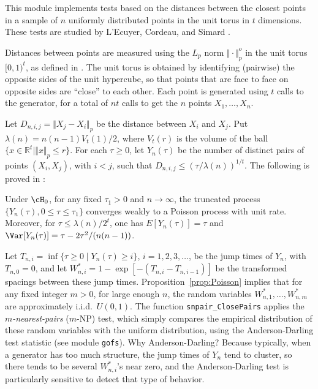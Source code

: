 
This module implements tests based on the distances between
the closest points in a sample of $n$ uniformly distributed points in
the unit torus in $t$ dimensions.  
These tests are studied by L'Ecuyer, Cordeau, and Simard \cite{rLEC00c}.

Distances between points are measured using the $L_p$ norm 
$\Vert\cdot\Vert_p^o$ in the unit torus $[0,1)^t$, 
as defined in \cite{rLEC00c}.
The unit torus is obtained by identifying (pairwise) the opposite 
sides of the unit hypercube, so that points that are face to face on 
opposite sides are ``close'' to each other.
Each point is generated using $t$ calls to the generator, for a total
of $nt$ calls to get the $n$ points $X_1,\dots,X_n$.

Let $D_{n,i,j} = \Vert X_j - X_i\Vert_p$
be the distance between $X_i$ and $X_j$.
Put $\lambda(n) = n(n-1)V_t(1)/2$, where $V_t(r)$
is the volume of the ball $\{x \in \mathbb{R}^t \mid \Vert x\Vert_p \le r\}$.
For each $\tau\ge 0$, let $Y_n(\tau)$ be the number of distinct pairs
of points $(X_i, X_j)$, with $i<j$, such that
$D_{n,i,j} \le (\tau/\lambda(n))^{1/t}$.
The following is proved in \cite{rLEC00c}:

\begin {proposition}                      \label{prop:Poisson} 
Under $\cH_0$, for any fixed $\tau_1 > 0$ and $n\to\infty$, 
the truncated process $\{Y_n(\tau), 0\le \tau\le \tau_1\}$
converges weakly to a Poisson process with unit rate.
Moreover, for $\tau\le \lambda(n) /2^{t}$, one has 
$E[Y_n(\tau)] = \tau$ and $\Var[Y_n(\tau)] = \tau - {2\tau^2 / (n(n-1))}$.
\end {proposition}

Let $T_{n,i} = \inf\{\tau\ge 0 \mid Y_n(\tau) \ge i\}$, $i=1,2,3,\dots$,
be the jump times of $Y_n$, with $T_{n,0}=0$, and let
$W^*_{n,i} = 1-\exp[-(T_{n,i} - T_{n,i-1})]$ be the transformed
spacings between these jump times.
Proposition~\ref{prop:Poisson} implies that for any fixed integer $m > 0$,
for large enough $n$, the random variables $W^*_{n,1},\dots,W^*_{n,m}$
are approximately i.i.d.\ $U(0,1)$.
The function {\tt snpair\_ClosePairs} applies the 
{\em $m$-nearest-pairs\/} ({$m$-NP}) test,
which simply compares the empirical distribution of these random
variables with the uniform distribution, 
using the Anderson-Darling test statistic (see module {\tt gofs}).
Why Anderson-Darling?  Because typically, when a generator has too
much structure, the jump times of $Y_n$ tend to cluster, so there tends
to be several $W^*_{n,i}$'s near zero, and the Anderson-Darling test
is particularly sensitive to detect that type of behavior.

